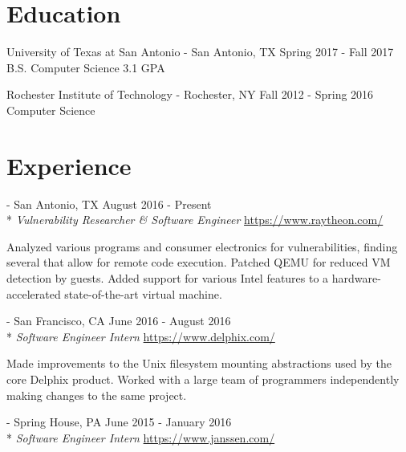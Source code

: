 \documentclass[letterpaper,margin,line,11pt]{resume}
\newcommand{\rurl}[1]{\hfill {\footnotesize \url{#1}}}
\newcommand{\rdate}[1]{\hfill {\small #1}}
\renewcommand{\employer}[5]{\item[#1] - #2 \rdate{#3} \\* #4 \rurl{#5}}
\begin{document}
\begin{resume}
\section{\mysidestyle Education}
    \begin{compactdesc}
        \item[University of Texas at San Antonio] - San Antonio, TX \rdate{Spring 2017 - Fall 2017}
        \small
        \\B.S. Computer Science
        \hfill 3.1 GPA
    \end{compactdesc}
    \begin{compactdesc}
        \item[Rochester Institute of Technology] - Rochester, NY \rdate{Fall 2012 - Spring 2016}
        \small
        \\Computer Science
    \end{compactdesc}

\section{\mysidestyle Experience}
    \begin{asparadesc}
        \employer{Raytheon}{San Antonio, TX} {August 2016 - Present}{\textit{Vulnerability Researcher \& Software Engineer}}{https://www.raytheon.com/}

        \small
	Analyzed various programs and consumer electronics for vulnerabilities, finding several that allow for remote
        code execution. Patched QEMU for reduced VM detection by guests. Added support for various Intel features to a
        hardware-accelerated state-of-the-art virtual machine.
        \normalsize
        \\

        \employer{Delphix}{San Francisco, CA} {June 2016 - August 2016}{\textit{Software Engineer Intern}}{https://www.delphix.com/}

        \small
        Made improvements to the Unix filesystem mounting abstractions used by the core Delphix product. Worked with a
        large team of programmers independently making changes to the same project.
        \normalsize
        \\

        \employer{Janssen Biotech}{Spring House, PA}{June 2015 - January 2016}{\textit{Software Engineer Intern}}{https://www.janssen.com/}


\end{asparadesc}
\end{resume}
\end{document}
